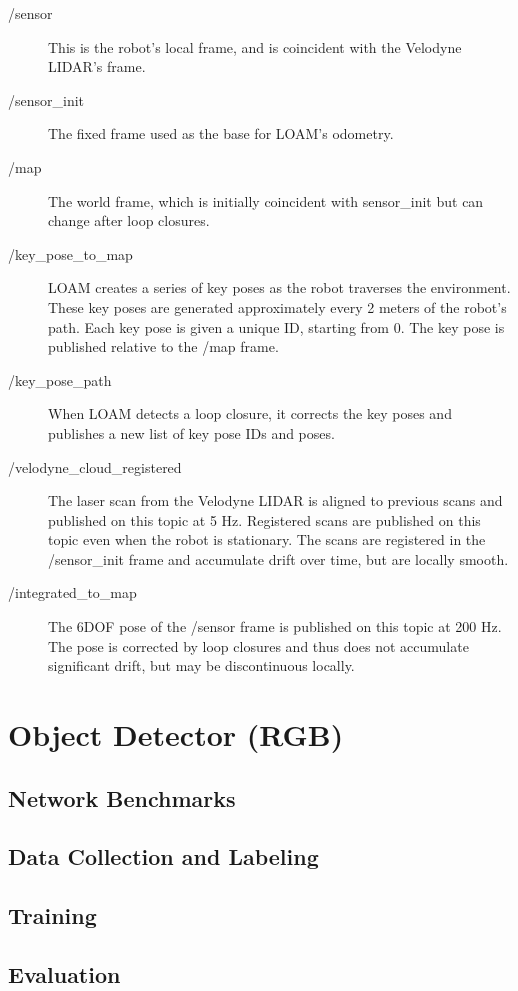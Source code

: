 \begin{description}
	\item[/sensor] This is the robot's local frame, and is coincident with the Velodyne LIDAR's frame.
	\item[/sensor\_init] The fixed frame used as the base for LOAM's odometry.
	\item[/map] The world frame, which is initially coincident with sensor\_init but can change after loop closures.
	\item[/key\_pose\_to\_map] LOAM creates a series of key poses as the robot traverses the environment. These key poses are generated approximately every 2 meters of the robot's path. Each key pose is given a unique ID, starting from 0. The key pose is published relative to the /map frame.
	\item[/key\_pose\_path] When LOAM detects a loop closure, it corrects the key poses and publishes a new list of key pose IDs and poses.
	\item[/velodyne\_cloud\_registered] The laser scan from the Velodyne LIDAR is aligned to previous scans and published on this topic at 5 Hz. Registered scans are published on this topic even when the robot is stationary. The scans are registered in the /sensor\_init frame and accumulate drift over time, but are locally smooth.
	\item[/integrated\_to\_map] The 6DOF pose of the /sensor frame is published on this topic at 200 Hz. The pose is corrected by loop closures and thus does not accumulate significant drift, but may be discontinuous locally.
\end{description}

\section{Object Detector (RGB)}

\subsection{Network Benchmarks}
\subsection{Data Collection and Labeling}
\subsection{Training}
\subsection{Evaluation}

